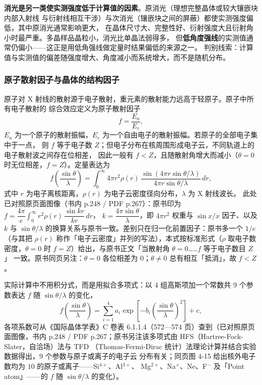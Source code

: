 \begin{pitfall}
\textbf{消光是另一类使实测强度低于计算值的因素}。原消光（理想完整晶体或较大镶嵌块内部入射线
与衍射线相互干涉）与次消光（镶嵌块之间的屏蔽）都使实测强度偏低，其中原消光通常影响更大，
在晶体尺寸大、完整性好、衍射强度大且衍射角小时最严重。多晶样品晶粒小，消光比单晶法弱得多，
但\textbf{低角度强线}的实测值通常仍偏小——这正是用低角强线做定量时结果偏低的来源之一。
判别线索：计算值与实测值的偏差随强度增大、角度减小而系统增大，而不是随机分布。
\end{pitfall}

\subsubsection{原子散射因子与晶体的结构因子}

原子对 X 射线的散射源于电子散射，重元素的散射能力远高于轻原子。原子中所有电子散射的
综合效应定义为原子散射因子
\begin{equation}
f=\frac{E_{a}}{E_{e}},
\label{eq:ch04b-f}
\end{equation}
$E_{a}$ 为一个原子的散射振幅，$E_{e}$ 为一个自由电子的散射振幅。若原子的全部电子集中于一点，
则 $f$ 等于电子数 $Z$；但电子分布在核周围形成电子云，不同轨道上的电子散射波之间存在位相差，
因此一般有 $f<Z$，且随散射角增大而减小（$\theta=0$ 时无位相差，$f=Z$）。定量表达为
\begin{equation}
f\!\left(\frac{\sin\theta}{\lambda}\right)=\int_{0}^{\infty}4\pi r^{2}\rho(r)\,
\frac{\sin\!\left(4\pi r\sin\theta/\lambda\right)}{4\pi r\sin\theta/\lambda}\,dr ,
\label{eq:ch04b-fint}
\end{equation}
式中 $r$ 为电子离核距离，$\rho(r)$ 为电子云密度径向分布，$\lambda$ 为 X 射线波长。
此处已对照原页面图像（书内 p.248 / PDF p.267）：原书印为
$f=\dfrac{4\pi}{e}\displaystyle\int_{0}^{\infty}r^{2}\rho(r)\,\dfrac{\sin kr}{kr}\,dr$，
$k=\dfrac{4\pi\sin\theta}{\lambda}$，即 $4\pi r^{2}$ 权重与 $\sin x/x$ 因子、以及
$k$ 与 $\sin\theta/\lambda$ 的换算关系与原书一致。差别只在归一化前置因子：原书多一个
$1/e$（与其把 $\rho(r)$ 称作「电子云密度」并列的写法），本式按标准形式（$\rho$ 取电子数
密度，$\theta=0$ 时 $f=Z$）给出，与原书正文「当散射角 $\theta=0$……$f$ 等于电子数目 $Z$」
一致。原书同页另注：$\theta=0$ 各位相差为 $0$；$\theta\neq0$ 总有相互「抵消」，故 $f<Z$。

实际计算中不用积分式，而是用拟合多项式：以 4 组高斯项加一个常数共 9 个参数表达 $f$ 随
$\sin\theta/\lambda$ 的变化，
\begin{equation}
f\!\left(\frac{\sin\theta}{\lambda}\right)=\sum_{i=1}^{4}a_{i}\exp\!\left[-b_{i}
\left(\frac{\sin\theta}{\lambda}\right)^{2}\right]+c ,
\label{eq:ch04b-fpoly}
\end{equation}
各项系数可从《国际晶体学表》C 卷表 6.1.1.4（572—574 页）查到（已对照原页面图像，书内
p.248 / PDF p.267；原书另注该多项式由 HFS（Hartree-Fock-Slater，自洽场）法与 TFD
（Thomas-Fermi-Dirac 统计）法理论计算并结合实验数据得出，$9$ 个参数与原子或离子的电子云
分布有关；同页图 4-15 给出核外电子数均为 $10$ 的原子或离子——Si$^{4+}$、Al$^{3+}$、
Mg$^{2+}$、Na$^{+}$、Ne、F$^{-}$ 及「Point atom」——的 $f$ 随 $\sin\theta/\lambda$ 的变化）。

